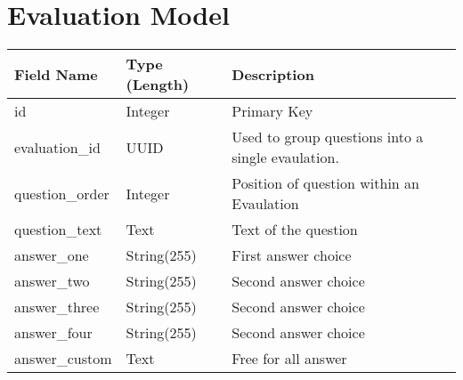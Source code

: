 \documentclass[letterpaper,10pt,english]{sphinxmanual}
\begin{document}
\section{Evaluation Model}
\label{dev-models:evaluation-model-label}\label{dev-models:evaluation-model}
\begin{tabulary}{\linewidth}{|L|L|L|}
\hline
\textsf{\relax 
Field Name
} & \textsf{\relax 
Type (Length)
} & \textsf{\relax 
Description
}\\
\hline
id
 & 
Integer
 & 
Primary Key
\\

evaluation\_id
 & 
UUID
 & 
Used to group questions into a single
evaulation.
\\

question\_order
 & 
Integer
 & 
Position of question within an
Evaulation
\\

question\_text
 & 
Text
 & 
Text of the question
\\

answer\_one
 & 
String(255)
 & 
First answer choice
\\

answer\_two
 & 
String(255)
 & 
Second answer choice
\\

answer\_three
 & 
String(255)
 & 
Second answer choice
\\

answer\_four
 & 
String(255)
 & 
Second answer choice
\\

answer\_custom
 & 
Text
 & 
Free for all answer
\\
\hline\end{tabulary}
\end{document}
